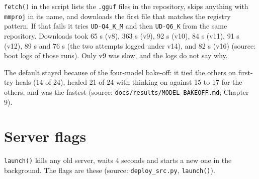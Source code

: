 \documentclass[11pt,a4paper]{report}
\begin{document}
\texttt{fetch()} in the script lists the \texttt{.\allowbreak{}gguf} files in the repository, skips anything with \texttt{mmproj} in its name, and downloads the first file that matches the registry pattern. If that fails it tries \texttt{UD-\allowbreak{}Q4\_\allowbreak{}K\_\allowbreak{}M} and then \texttt{UD-\allowbreak{}Q6\_\allowbreak{}K} from the same repository. Downloads took 65 s (v8), 363 s (v9), 92 s (v10), 84 s (v11), 91 s (v12), 89 s and 76 s (the two attempts logged under v14), and 82 s (v16) (source: boot logs of those runs). Only v9 was slow, and the logs do not say why.

The default stayed because of the four-model bake-off: it tied the others on first-try heals (14 of 24), healed 21 of 24 with thinking on against 15 to 17 for the others, and was the fastest (source: \texttt{docs/\allowbreak{}results/\allowbreak{}MODEL\_\allowbreak{}BAKEOFF.\allowbreak{}md}; Chapter 9).

\section{Server flags}

\texttt{launch()} kills any old server, waits 4 seconds and starts a new one in the background. The flags are these (source: \texttt{deploy\_\allowbreak{}src.\allowbreak{}py}, \texttt{launch()}).
\end{document}
